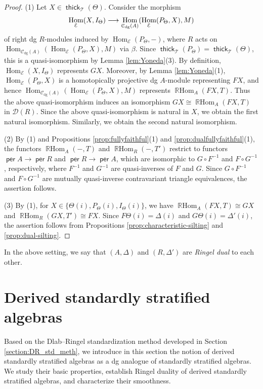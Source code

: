 \documentclass[a4paper,reqno,11pt]{amsart}
\numberwithin{equation}{section}
\theoremstyle{definition}
\newcommand{\C}{\mathcal{C}}
\newcommand{\D}{\mathcal{D}}
\newcommand{\E}{\mathcal{E}}
\newcommand{\T}{\mathcal{T}}
\newcommand{\bte}{\Theta}
\newcommand{\bde}{\Delta}
\newcommand{\lto}{\longrightarrow}
\DeclareMathOperator{\thick}{\mathsf{thick}}
\DeclareMathOperator{\per}{\mathsf{per}}
\DeclareMathOperator{\Hom}{Hom}
\DeclareMathOperator{\RHom}{\mathbb{R}Hom}
\newcommand{\dgmod}{\C_{\mathrm{dg}}}
\begin{document}
\begin{proof}
(1) Let $X\in\thick_{\T}(\bte)$.
Consider the morphism
\begin{align}
\Hom_{\E}(X,I_{\bte})\lto\Hom_{\dgmod(A)}(\Hom_{\E}(P_{\bte},X),M)\notag
\end{align}
of right dg $R$-modules induced by $\Hom_{\E}(P_{\bte},-)$, where $R$ acts on $\Hom_{\dgmod(A)}(\Hom_{\E}(P_{\bte},X),M)$ via $\beta$.
Since $\thick_{\T}(P_{\bte})=\thick_{\T}(\bte)$, this is a quasi-isomorphism by Lemma \ref{lem:Yoneda}(3).
By definition, $\Hom_{\E}(X,I_{\bte})$ represents $GX$.
Moreover, by Lemma \ref{lem:Yoneda}(1), $\Hom_{\E}(P_{\bte},X)$ is a homotopically projective dg $A$-module representing $FX$, and hence $\Hom_{\dgmod(A)}(\Hom_{\E}(P_{\bte},X),M)$ represents $\RHom_{A}(FX,T)$.
Thus the above quasi-isomorphism induces an isomorphism $GX\cong\RHom_{A}(FX,T)$ in $\D(R)$.
Since the above quasi-isomorphism is natural in $X$, we obtain the first natural isomorphism.
Similarly, we obtain the second natural isomorphism.

(2) By (1) and Propositions \ref{prop:fullyfaithful}(1) and \ref{prop:dualfullyfaithful}(1), the functors $\RHom_{A}(-,T)$ and $\RHom_{R}(-,T')$ restrict to functors $\per A\to\per R$ and $\per R\to\per A$, which are isomorphic to $G\circ F^{-1}$ and $F\circ G^{-1}$, respectively, where $F^{-1}$ and $G^{-1}$ are quasi-inverses of $F$ and $G$.
Since $G\circ F^{-1}$ and $F\circ G^{-1}$ are mutually quasi-inverse contravariant triangle equivalences, the assertion follows.

(3) By (1), for $X\in\{\bte(i),P_{\bte}(i),I_{\bte}(i)\}$, we have $\RHom_{A}(FX,T)\cong GX$ and $\RHom_{R}(GX,T')\cong FX$.
Since $F\bte(i)=\bde(i)$ and $G\bte(i)=\bde'(i)$, the assertion follows from Propositions \ref{prop:characteristic-silting} and \ref{prop:dual-silting}.
\end{proof}

In the above setting, we say that $(A,\bde)$ and $(R,\bde')$ are \emph{Ringel dual} to each other.



\section{Derived standardly stratified algebras}

Based on the Dlab--Ringel standardization method developed in Section \ref{section:DR_std_meth}, we introduce in this section the notion of derived standardly stratified algebras as a dg analogue of standardly stratified algebras.
We study their basic properties, establish Ringel duality of derived standardly stratified algebras, and characterize their smoothness.
\end{document}
